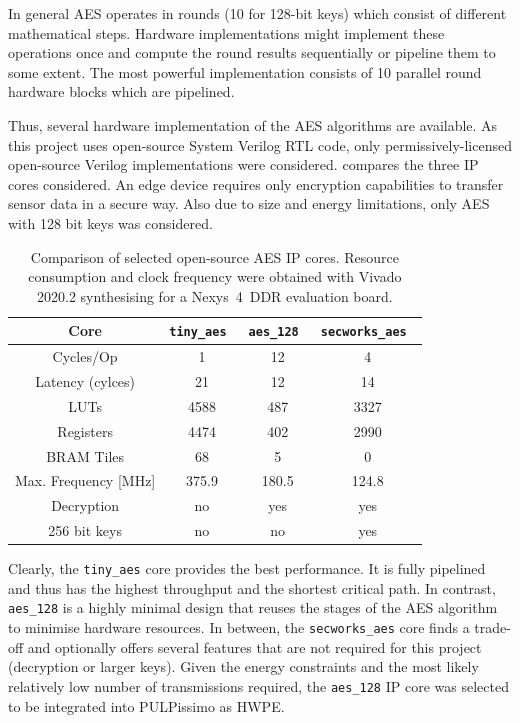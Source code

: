 \documentclass[a4paper, 12pt]{article}
\begin{document}
In general AES operates in rounds (10 for 128-bit keys) which consist of different mathematical steps. Hardware implementations might implement these operations once and compute the round results sequentially or pipeline them to some extent. The most powerful implementation consists of 10 parallel round hardware blocks which are pipelined.

Thus, several hardware implementation of the AES algorithms are available. As this project uses open-source System Verilog RTL code, only permissively-licensed open-source Verilog implementations were considered.  compares the three IP cores considered. An edge device requires only encryption capabilities to transfer sensor data in a secure way. Also due to size and energy limitations, only AES with 128 bit keys was considered.

\begin{table}[h]
    \centering
    \begin{tabular}{c|c c c}
        \toprule
        Core &  \verb|tiny_aes|~\cite{tiny-aes} & \verb|aes_128|~\cite{aes-128} & \verb|secworks_aes|~\cite{secworks-aes}  \\
        \midrule
        Cycles/Op &  1 & 12 & 4\\
        Latency (cylces) & 21 & 12 & 14\\
        LUTs & 4588 & 487 & 3327 \\
        Registers & 4474 & 402 & 2990 \\
        BRAM Tiles & 68 & 5 & 0 \\
        Max. Frequency [MHz] & 375.9 & 180.5 & 124.8 \\
        Decryption & no & yes  & yes \\
        256 bit keys & no & no & yes\\
        \bottomrule
    \end{tabular}
	\label{tab:aes_cores}
	\caption{Comparison of selected open-source AES IP cores. Resource consumption and clock frequency were obtained with Vivado 2020.2 synthesising for a Nexys~4~DDR evaluation board.}
\end{table}

Clearly, the \verb|tiny_aes| core provides the best performance. It is fully pipelined and thus has the highest throughput and the shortest critical path. In contrast, \verb|aes_128| is a highly minimal design that reuses the stages of the AES algorithm to minimise hardware resources. In between, the \verb|secworks_aes| core finds a trade-off and optionally offers several features that are not required for this project (decryption or larger keys). Given the energy constraints and the most likely relatively low number of transmissions required, the \verb|aes_128| IP core was selected to be integrated into PULPissimo as HWPE.
\end{document}
